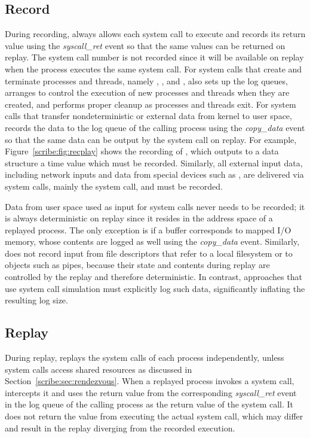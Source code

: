   

\subsection{Record}

During recording, \scribe{} always allows each system call to execute
and records its return value using the {\em syscall\_ret} event so
that the same values can be returned on replay.  The system call
number is not recorded since it will be available on replay when the
process executes the same system call.  
For system calls that create and terminate processes and threads,
namely , , and , \scribe{} also sets
up the log queues, arranges to control the execution of new processes
and threads when they are created, and performs proper cleanup as
processes and threads exit.
For system calls that transfer nondeterministic or external data from
kernel to user space, \scribe{} records the data to the log
queue of the calling process using the {\em copy\_data} event
so that the same data can be output by the system call on replay.
For example, Figure~\ref{scribe:fig:recplay} shows the recording of
, which outputs to a data structure a time value
which must be recorded. Similarly, all external input data, including
network inputs and data from special devices such
as , are delivered via system calls, mainly
the  system call, and must be recorded.

Data from user space used as input for system calls never
needs to be recorded; it is always deterministic on replay since it
resides in the address space of a replayed process. The only exception
is if a buffer corresponds to mapped I/O memory, whose
contents are logged as well using the {\em copy\_data}
event. Similarly, \scribe{} does not record input from file
descriptors that refer to a local filesystem or to objects such as
pipes, because their state and contents during replay are controlled
by the replay and therefore deterministic.  In contrast, approaches
that use system call simulation must explicitly log such data,
significantly inflating the resulting log size. 

\subsection{Replay}

During replay, \scribe{} replays the system calls of each process
independently, unless system calls access shared resources as discussed
in Section~\ref{scribe:sec:rendezvous}.  When a replayed process invokes a
system call, \scribe{} intercepts it and uses the return value from the
corresponding {\em syscall\_ret} event in the log queue of the calling
process as the return value of the system call.  It does not return
the value from executing the actual system call, which may differ and
result in the replay diverging from the recorded execution. 

